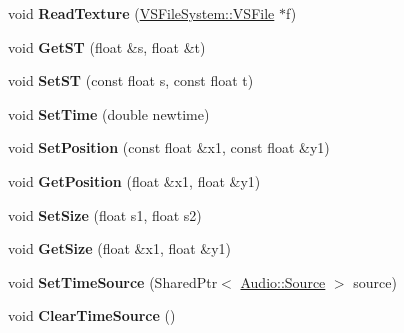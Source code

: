 \begin{DoxyCompactItemize}
\item 
void {\bfseries Read\+Texture} (\hyperlink{classVSFileSystem_1_1VSFile}{V\+S\+File\+System\+::\+V\+S\+File} $\ast$f)\hypertarget{classVSSprite_a23dc5684f6f5b5c435cb6d843afc4835}{}\label{classVSSprite_a23dc5684f6f5b5c435cb6d843afc4835}

\item 
void {\bfseries Get\+ST} (float \&s, float \&t)\hypertarget{classVSSprite_a29726268a29514ed94d48fa240befdec}{}\label{classVSSprite_a29726268a29514ed94d48fa240befdec}

\item 
void {\bfseries Set\+ST} (const float s, const float t)\hypertarget{classVSSprite_aef2e1c0978db3fae94a506e2964fc97e}{}\label{classVSSprite_aef2e1c0978db3fae94a506e2964fc97e}

\item 
void {\bfseries Set\+Time} (double newtime)\hypertarget{classVSSprite_ace02a254fb69b2f170721df95f3ebeb5}{}\label{classVSSprite_ace02a254fb69b2f170721df95f3ebeb5}

\item 
void {\bfseries Set\+Position} (const float \&x1, const float \&y1)\hypertarget{classVSSprite_af463e8237377ef9cab8424c51888fd7b}{}\label{classVSSprite_af463e8237377ef9cab8424c51888fd7b}

\item 
void {\bfseries Get\+Position} (float \&x1, float \&y1)\hypertarget{classVSSprite_a9f005a2b2f67393bb117ddb8f4c89a00}{}\label{classVSSprite_a9f005a2b2f67393bb117ddb8f4c89a00}

\item 
void {\bfseries Set\+Size} (float s1, float s2)\hypertarget{classVSSprite_aa3237dbd9f90ec5283b51716939079e3}{}\label{classVSSprite_aa3237dbd9f90ec5283b51716939079e3}

\item 
void {\bfseries Get\+Size} (float \&x1, float \&y1)\hypertarget{classVSSprite_ad93eed0cebc3765cf819cf3d5a7fc0be}{}\label{classVSSprite_ad93eed0cebc3765cf819cf3d5a7fc0be}

\item 
void {\bfseries Set\+Time\+Source} (Shared\+Ptr$<$ \hyperlink{classAudio_1_1Source}{Audio\+::\+Source} $>$ source)\hypertarget{classVSSprite_a20408330cede15456de837b7abdb2fab}{}\label{classVSSprite_a20408330cede15456de837b7abdb2fab}

\item 
void {\bfseries Clear\+Time\+Source} ()\hypertarget{classVSSprite_ad7329b9eafdd3b36469f9f91428f5ab7}{}\label{classVSSprite_ad7329b9eafdd3b36469f9f91428f5ab7}


\end{DoxyCompactItemize}
